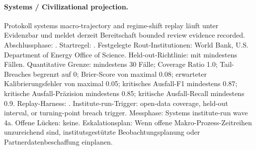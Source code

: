 \paragraph{Systems / Civilizational projection.}
Protokoll systems macro-trajectory and regime-shift replay läuft unter Evidenzbar  und meldet derzeit Bereitschaft bounded review evidence recorded.
Abschlussphase: . Startregel: .
Festgelegte Rout-Institutionen: World Bank, \allowbreak U.S. Department of Energy Office of Science.
Held-out-Richtlinie:  mit mindestens  Fällen.
Quantitative Grenze: mindestens 30 Fälle; Coverage Ratio 1.0; Tail-Breaches begrenzt auf 0; Brier-Score von maximal 0.08; erwarteter Kalibrierungsfehler von maximal 0.05; kritisches Ausfall-F1 mindestens 0.87; kritische Ausfall-Präzision mindestens 0.85; kritische Ausfall-Recall mindestens 0.9.
Replay-Harness: .
Institute-run-Trigger: open-data coverage, held-out interval, or turning-point breach trigger. Messphase: Systems institute-run wave 4a.
Offene Lücken: keine.
Eskalationsplan: Wenn offene Makro-Prozess-Zeitreihen unzureichend sind, institutsgestützte Beobachtungsplanung oder Partnerdatenbeschaffung einplanen.

